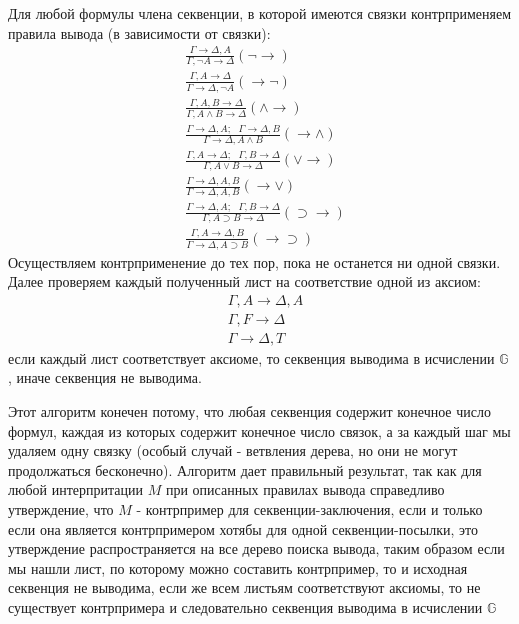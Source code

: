 \documentclass[a4paper,12pt]{article}
\begin{document}
\begin{Solution}
Для любой формулы члена секвенции, в которой имеются связки контрприменяем правила вывода (в зависимости от связки):
\[
	\begin{split}
		&\frac{\Gamma \rightarrow \Delta, A}{\Gamma, \neg A \rightarrow \Delta} \left(\neg \rightarrow\right) \\
		&\frac{\Gamma, A \rightarrow \Delta}{\Gamma \rightarrow \Delta, \neg A} \left(\rightarrow \neg\right) \\
		&\frac{\Gamma, A, B \rightarrow \Delta}{\Gamma, A \land B \rightarrow \Delta}\left(\land \rightarrow\right) \\
		&\frac{\Gamma \rightarrow \Delta, A; ~~~ \Gamma \rightarrow \Delta, B}{\Gamma \rightarrow \Delta, A \land B} \left(\rightarrow \land\right) \\
		&\frac{\Gamma, A \rightarrow \Delta; ~~~ \Gamma, B \rightarrow \Delta}{\Gamma, A \lor B \rightarrow \Delta} \left(\lor \rightarrow\right) \\
		&\frac{\Gamma \rightarrow \Delta, A, B}{\Gamma \rightarrow \Delta, A, B}\left(\rightarrow\lor\right) \\
		&\frac{\Gamma \rightarrow \Delta, A; ~~~ \Gamma, B \rightarrow \Delta}{\Gamma, A \supset B \rightarrow \Delta}\left(\supset \rightarrow\right) \\
		& \frac{\Gamma, A \rightarrow \Delta, B}{\Gamma \rightarrow \Delta, A \supset B}\left(\rightarrow\supset\right)
	\end{split}
\]
Осуществляем контрприменение до тех пор, пока не останется ни одной связки. Далее проверяем каждый полученный лист на соответствие одной из аксиом:
\[
	\begin{split}
		& \Gamma, A \rightarrow \Delta, A \\
		& \Gamma, F \rightarrow \Delta \\
		& \Gamma \rightarrow \Delta, T
	\end{split}
\]
если каждый лист соответствует аксиоме, то секвенция выводима в исчислении $\mathbb{G}$, иначе секвенция не выводима.

Этот алгоритм конечен потому, что любая секвенция содержит конечное число формул, каждая из которых содержит конечное число связок, а за каждый шаг мы удаляем одну связку (особый случай - ветвления дерева, но они не могут продолжаться бесконечно). Алгоритм дает правильный результат, так как для любой интерпритации $M$ при описанных правилах вывода справедливо утверждение, что $M$ - контрпример для секвенции-заключения, если и только если она является контрпримером хотябы для одной секвенции-посылки, это утверждение распространяется на все дерево поиска вывода, таким образом если мы нашли лист, по которому можно составить контрпример, то и исходная секвенция не выводима, если же всем листьям соответствуют аксиомы, то не существует контрпримера и следовательно секвенция выводима в исчислении $\mathbb{G}$
\end{Solution}
\end{document}
